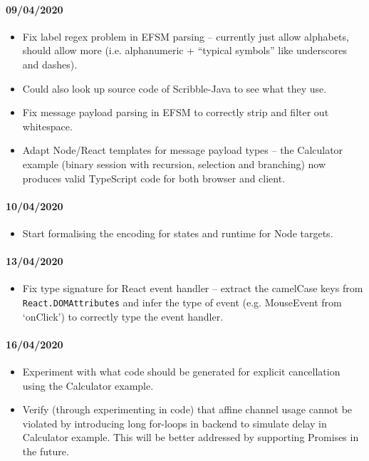 \documentclass{article}
\begin{document}
\paragraph{09/04/2020}
\begin{itemize}
\item
Fix label regex problem in EFSM parsing -- currently just
allow alphabets, should allow more (i.e. alphanumeric
+ ``typical symbols'' like underscores and dashes).

\item
Could also look up source code of Scribble-Java to see what they use.

\item
Fix message payload parsing in EFSM to correctly strip and filter out whitespace.

\item
Adapt Node/React templates for message payload types -- the Calculator example
(binary session with recursion, selection and branching) now produces valid TypeScript
code for both browser and client.

\end{itemize}

\paragraph{10/04/2020}
\begin{itemize}
\item
Start formalising the encoding for states and runtime for Node targets.
\end{itemize}

\paragraph{13/04/2020}
\begin{itemize}
\item
Fix type signature for React event handler -- extract the 
camelCase keys from \texttt{React.DOMAttributes} and infer
the type of event (e.g. MouseEvent from `onClick') to correctly
type the event handler.
\end{itemize}

\paragraph{16/04/2020}
\begin{itemize}
\item
Experiment with what code should be generated
for explicit cancellation using the Calculator example.

\item
Verify (through experimenting in code) that affine channel
usage cannot be violated by introducing long for-loops
in backend to simulate delay in Calculator example. 
This will be better addressed by supporting Promises
in the future.

\end{itemize}
\end{document}

